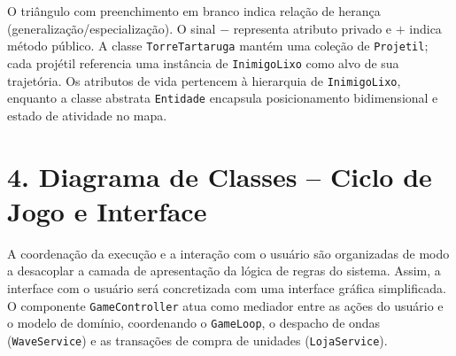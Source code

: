 \documentclass[11pt,a4paper]{article}
\begin{document}
O triângulo com preenchimento em branco indica relação de herança (generalização/especialização). O sinal $-$ representa atributo privado e $+$ indica método público. A classe \texttt{TorreTartaruga} mantém uma coleção de \texttt{Projetil}; cada projétil referencia uma instância de \texttt{InimigoLixo} como alvo de sua trajetória. Os atributos de vida pertencem à hierarquia de \texttt{InimigoLixo}, enquanto a classe abstrata \texttt{Entidade} encapsula posicionamento bidimensional e estado de atividade no mapa.

\clearpage
\section*{4. Diagrama de Classes -- Ciclo de Jogo e Interface}
A coordenação da execução e a interação com o usuário são organizadas de modo a desacoplar a camada de apresentação da lógica de regras do sistema. Assim, a interface com o usuário será concretizada com uma interface gráfica simplificada. O componente \texttt{GameController} atua como mediador entre as ações do usuário e o modelo de domínio, coordenando o \texttt{GameLoop}, o despacho de ondas (\texttt{WaveService}) e as transações de compra de unidades (\texttt{LojaService}).
\end{document}
